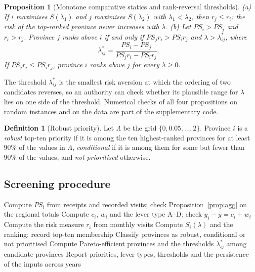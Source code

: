 \documentclass[11pt,a4paper]{article}
\newcommand{\PS}{\mathit{PS}}
\theoremstyle{plain}\newtheorem{proposition}{Proposition}
\theoremstyle{definition}\newtheorem{definition}{Definition}
\begin{document}
\begin{proposition}[Monotone comparative statics and rank-reversal thresholds]\label{prop:mcs}
(a) If $i$ maximises $S(\lambda_1)$ and $j$ maximises $S(\lambda_2)$ with $\lambda_1<\lambda_2$, then $r_j\le r_i$: the risk of the top-ranked province never increases with $\lambda$. (b) Let $\PS_i>\PS_j$ and $r_i>r_j$. Province $j$ ranks above $i$ if and only if $\PS_jr_i>\PS_ir_j$ and $\lambda>\lambda^{*}_{ij}$, where
\begin{equation}
\lambda^{*}_{ij}=\frac{\PS_i-\PS_j}{\PS_jr_i-\PS_ir_j}.
\end{equation}
If $\PS_jr_i\le\PS_ir_j$, province $i$ ranks above $j$ for every $\lambda\ge0$.
\end{proposition}
The threshold $\lambda^{*}_{ij}$ is the smallest risk aversion at which the ordering of two candidates reverses, so an authority can check whether its plausible range for $\lambda$ lies on one side of the threshold. Numerical checks of all four propositions on random instances and on the data are part of the supplementary code.

\begin{definition}[Robust priority]
Let $\Lambda$ be the grid $\{0,0.05,\dots,2\}$. Province $i$ is a \emph{robust} top-ten priority if it is among the ten highest-ranked provinces for at least 90\% of the values in $\Lambda$, \emph{conditional} if it is among them for some but fewer than 90\% of the values, and \emph{not prioritised} otherwise.
\end{definition}

\subsection{Screening procedure}
\begin{algorithm}[t]
\caption{Screening procedure for provincial tourism yield}\label{alg:screen}
\begin{algorithmic}[1]
\State Compute $\PS_i$ from receipts and recorded visits; check Proposition~\ref{prop:agg} on the regional totals
\State Compute $c_i$, $w_i$ and the lever type A--D; check $y_i-\bar y=c_i+w_i$
\State Compute the risk measure $r_i$ from monthly visits
  \State Compute $S_i(\lambda)$ and the ranking; record top-ten membership
\EndFor
\State Classify provinces as robust, conditional or not prioritised
\State Compute Pareto-efficient provinces and the thresholds $\lambda^{*}_{ij}$ among candidate provinces
\State Report priorities, lever types, thresholds and the persistence of the inputs across years
\end{algorithmic}
\end{algorithm}
\end{document}
